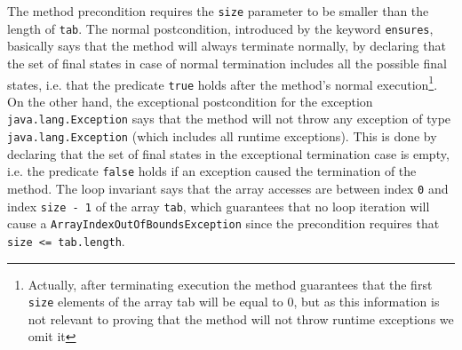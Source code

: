 The method precondition requires the \verb!size! parameter to be smaller than the length of \verb!tab!. The normal postcondition, introduced by the keyword \verb!ensures!, basically says that the method will always terminate normally, by declaring that the set of final states in case of normal termination includes all the possible final states, i.e. that the predicate \verb!true! holds after the method's normal execution\footnote{Actually, after terminating execution the method guarantees that the first \texttt{size} elements of the array tab will be equal to 0, but as this information is not relevant to proving that the method will not throw runtime exceptions we omit it}. On the other hand, the exceptional postcondition for the exception \texttt{java.lang.Exception} says that the method will not throw any exception of type \texttt{java.lang.Exception} (which includes all runtime exceptions). This is done by declaring that the set of final states in the exceptional termination case is empty, i.e. the predicate \texttt{false} holds if an exception caused the termination of the method. The loop invariant says that the array accesses are between index \verb!0! and index \verb!size - 1! of the array \verb!tab!, which guarantees that no loop iteration will cause a \verb!ArrayIndexOutOfBoundsException! since the precondition requires that \verb!size <= tab.length!.
